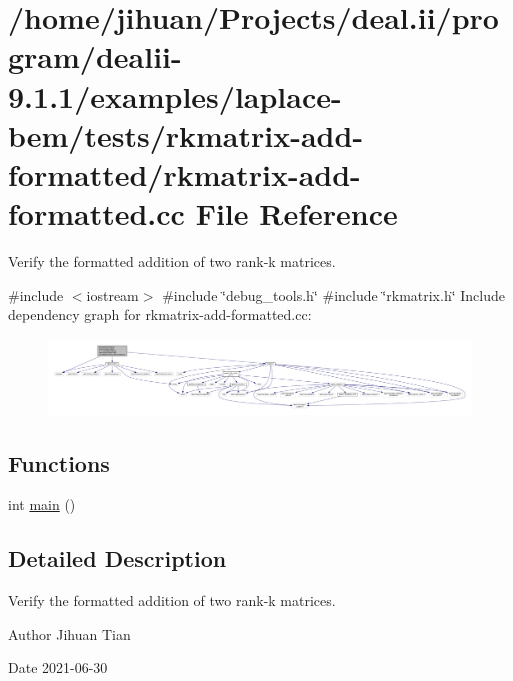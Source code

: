 \hypertarget{rkmatrix-add-formatted_8cc}{}\section{/home/jihuan/\+Projects/deal.ii/program/dealii-\/9.1.1/examples/laplace-\/bem/tests/rkmatrix-\/add-\/formatted/rkmatrix-\/add-\/formatted.cc File Reference}
\label{rkmatrix-add-formatted_8cc}


Verify the formatted addition of two rank-\/k matrices.  


{\ttfamily \#include $<$iostream$>$}\newline
{\ttfamily \#include \char`\"{}debug\+\_\+tools.\+h\char`\"{}}\newline
{\ttfamily \#include \char`\"{}rkmatrix.\+h\char`\"{}}\newline
Include dependency graph for rkmatrix-\/add-\/formatted.cc\+:\nopagebreak
\begin{figure}[H]
\begin{center}
\leavevmode
\includegraphics[width=350pt]{rkmatrix-add-formatted_8cc__incl}
\end{center}
\end{figure}
\subsection*{Functions}
\begin{DoxyCompactItemize}
\item 
int \hyperlink{rkmatrix-add-formatted_8cc_ae66f6b31b5ad750f1fe042a706a4e3d4}{main} ()
\end{DoxyCompactItemize}


\subsection{Detailed Description}
Verify the formatted addition of two rank-\/k matrices. 

\begin{DoxyAuthor}{Author}
Jihuan Tian 
\end{DoxyAuthor}
\begin{DoxyDate}{Date}
2021-\/06-\/30 
\end{DoxyDate}


